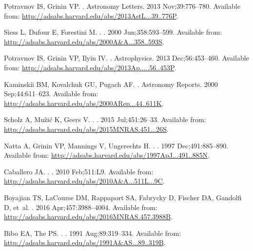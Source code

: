 \documentclass[]{rsos}
\begin{document}
\begin{thebibliography}{10}
{Potravnov} IS, {Grinin} VP.
.
\newblock Astronomy Letters. 2013 Nov;39:776--780.
\newblock Available from:
  \url{http://adsabs.harvard.edu/abs/2013AstL...39..776P}.

{Siess} L, {Dufour} E, {Forestini} M.
.
\newblock \aap. 2000 Jun;358:593--599.
\newblock Available from:
  \url{http://adsabs.harvard.edu/abs/2000A&A...358..593S}.

{Potravnov} IS, {Grinin} VP, {Ilyin} IV.
.
\newblock Astrophysics. 2013 Dec;56:453--460.
\newblock Available from:
  \url{http://adsabs.harvard.edu/abs/2013Ap.....56..453P}.

{Kaminski{\u \i}} BM, {Kovalchuk} GU, {Pugach} AF.
.
\newblock Astronomy Reports. 2000 Sep;44:611--623.
\newblock Available from:
  \url{http://adsabs.harvard.edu/abs/2000ARep...44..611K}.

{Scholz} A, {Mu{\v z}i{\'c}} K, {Geers} V.
.
\newblock \mnras. 2015 Jul;451:26--33.
\newblock Available from:
  \url{http://adsabs.harvard.edu/abs/2015MNRAS.451...26S}.

{Natta} A, {Grinin} VP, {Mannings} V, {Ungerechts} H.
.
\newblock \apj. 1997 Dec;491:885--890.
\newblock Available from:
  \url{http://adsabs.harvard.edu/abs/1997ApJ...491..885N}.

{Caballero} JA.
.
\newblock \aap. 2010 Feb;511:L9.
\newblock Available from:
  \url{http://adsabs.harvard.edu/abs/2010A&A...511L...9C}.

{Boyajian} TS, {LaCourse} DM, {Rappaport} SA, {Fabrycky} D, {Fischer} DA,
  {Gandolfi} D, et~al.
\newblock \mnras. 2016 Apr;457:3988--4004.
\newblock Available from:
  \url{http://adsabs.harvard.edu/abs/2016MNRAS.457.3988B}.

{Bibo} EA, {The} PS.
.
\newblock \aaps. 1991 Aug;89:319--334.
\newblock Available from:
  \url{http://adsabs.harvard.edu/abs/1991A&AS...89..319B}.


\end{thebibliography}
\end{document}

